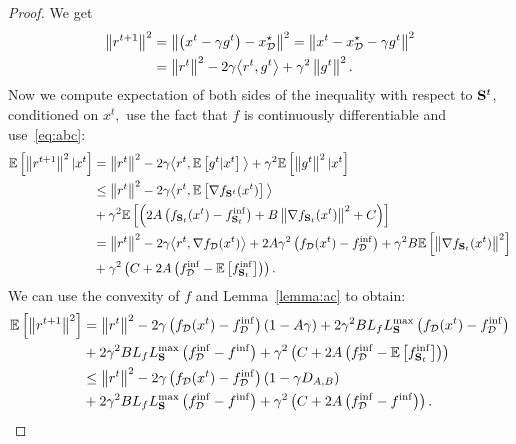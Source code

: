 \documentclass{article}
\newcommand{\bb}{\mathbb}
\newcommand{\norm}[1]{\left\| #1 \right\|}
\newcommand{\cD}{\mathcal{D}}
\newcommand{\Exp}[1]{{\bb E}\left[#1\right]}
\theoremstyle{plain}
\newcommand{\tf}{f_{\mathcal{D}}}
\newcommand{\mS}{{\bf S}}
\theoremstyle{plain}
\theoremstyle{definition}
\theoremstyle{remark}
\begin{document}
\begin{proof}
 We get
\begin{equation*}
	\begin{split}
		\left\|r^{t+1}\right\|^2 & = \left\|\left(x^t-\gamma g^t \right) - x_\cD^\star\right\|^2  = \left\|x^t-x_\cD^\star - \gamma g^t\right\|^2 \\
		& = \left\|r^{t}\right\|^2 - 2\gamma\big{<}r^t, g^t\big{>} + \gamma^2\left\|g^t\right\|^2.
	\end{split}
\end{equation*}
Now we compute expectation of both sides of the inequality with respect to $\mS^{t}$, conditioned on $x^t,$ use the fact that $f$ is continuously differentiable and use~\eqref{eq:abc}:
\begin{equation*}
	\begin{split}
		\mathbb{E}\left[\left\|r^{t+1}\right\|^2|x^t\right] &= \left\|r^{t}\right\|^2 - 2\gamma\big{<}r^t, \Exp{g^t|x^t}\big{>} + \gamma^2\Exp{\left\|g^t\right\|^2|x^t}\\
		& \leq \left\|r^{t}\right\|^2 - 2\gamma\big{<}r^t, \Exp{\nabla f_{\mS^{t}}(x^t)}\big{>}\\ &+\gamma^2\Exp{\left(2A\left(f_{\mS_t}(x^t) - f^{\inf}_{\mS_t}\right) + B\left\|\nabla f_{\mS_t}(x^t)\right\|^2 + C\right)}\\
		& = \left\|r^{t}\right\|^2 - 2\gamma\big{<}r^t, \nabla \tf(x^t)\big{>} + 2A\gamma^2\left(\tf(x^t) - \tf^{\inf}\right)+\gamma^2B\Exp{\left\|\nabla f_{\mS_t}(x^t)\right\|^2}\\
		& +\gamma^2\left(C + 2A\left(\tf^{\inf} - \Exp{f_{\mS_t}^{\inf}}\right)\right).\\
	\end{split}
\end{equation*}
We can use the convexity of $f$ and Lemma~\ref{lemma:ac} to obtain:
\begin{equation*}
	\begin{split}
		\Exp{\norm{r^{t+1}}^2} & = \norm{r^t}^2 - 2\gamma\left(\tf(x^t) - \tf^{\inf}\right)\left(1-A\gamma\right)+ 2\gamma^2BL_fL_{\mS}^{\max} \left(\tf(x^t) - \tf^{\inf}\right)\\
		& + 2\gamma^2BL_fL_{\mS}^{\max} \left(\tf^{\inf} - f^{\inf}\right) + \gamma^2\left(C + 2A\left(\tf^{\inf} - \Exp{f_{\mS_t}^{\inf}}\right)\right)\\
		& \leq \norm{r^t}^2 - 2\gamma\left(\tf(x^t) - \tf^{\inf}\right)\left(1 - \gamma D_{A,B} \right)\\
		& + 2\gamma^2BL_fL_{\mS}^{\max} \left(\tf^{\inf} - f^{\inf}\right) + \gamma^2\left(C + 2A\left(\tf^{\inf} - f^{\inf}\right)\right).\\

\end{split}
\end{equation*}
\end{proof}
\end{document}
